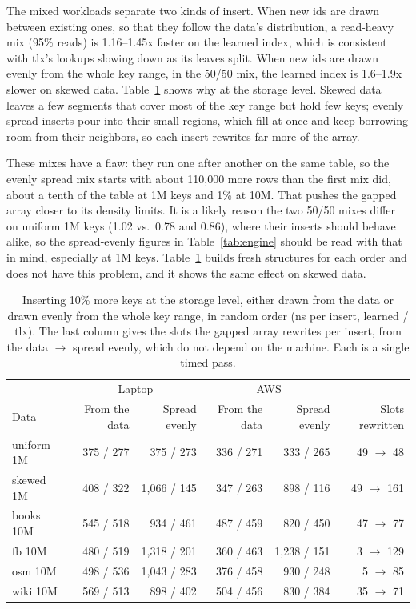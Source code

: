 \documentclass[conference]{IEEEtran}
\begin{document}
The mixed workloads separate two kinds of insert. When new ids are drawn
between existing ones, so that they follow the data's distribution, a
read-heavy mix (95\% reads) is 1.16--1.45x faster on the learned index,
which is consistent with tlx's lookups slowing down as its leaves split. When new
ids are drawn evenly from the whole key range, in the 50/50 mix, the learned index
is 1.6--1.9x slower on skewed data. Table~\ref{tab:spread} shows why at the
storage level. Skewed data leaves a few segments that cover most of the
key range but hold few keys; evenly spread inserts pour into their small
regions, which fill at once and keep borrowing room from their
neighbors, so each insert rewrites far more of the array.

These mixes have a flaw: they run one after another on the same table, so the
evenly spread mix starts with about 110,000 more rows than the first mix did,
about a tenth of the table at 1M keys and 1\% at 10M. That pushes the gapped array
closer to its density limits. It is a likely reason the two 50/50 mixes differ on
uniform 1M keys (1.02 vs.\ 0.78 and 0.86), where their inserts should behave
alike, so the spread-evenly figures in Table~\ref{tab:engine} should be read with
that in mind, especially at 1M keys. Table~\ref{tab:spread} builds fresh structures for each order and
does not have this problem, and it shows the same effect on skewed data.

\begin{table}[t]
\caption{Inserting 10\% more keys at the storage level, either drawn
from the data or drawn evenly from the whole key range, in random order
(ns per insert, learned / tlx). The last column gives the slots the gapped array
rewrites per insert, from the data $\to$ spread evenly, which do not depend on the
machine. Each is a single timed pass.}
\label{tab:spread}
\centering
\small
\begin{tabular}{lrrrrr}
\toprule
& \multicolumn{2}{c}{Laptop} & \multicolumn{2}{c}{AWS} & \\
Data & From the data & Spread evenly & From the data & Spread evenly & Slots rewritten \\
\midrule
uniform 1M & 375 / 277 & 375 / 273 & 336 / 271 & 333 / 265 & 49 $\to$ 48 \\
skewed 1M & 408 / 322 & 1,066 / 145 & 347 / 263 & 898 / 116 & 49 $\to$ 161 \\
books 10M & 545 / 518 & 934 / 461 & 487 / 459 & 820 / 450 & 47 $\to$ 77 \\
fb 10M & 480 / 519 & 1,318 / 201 & 360 / 463 & 1,238 / 151 & 3 $\to$ 129 \\
osm 10M & 498 / 536 & 1,043 / 283 & 376 / 458 & 930 / 248 & 5 $\to$ 85 \\
wiki 10M & 569 / 513 & 898 / 402 & 504 / 456 & 830 / 384 & 35 $\to$ 71 \\
\bottomrule
\end{tabular}
\end{table}
\end{document}
